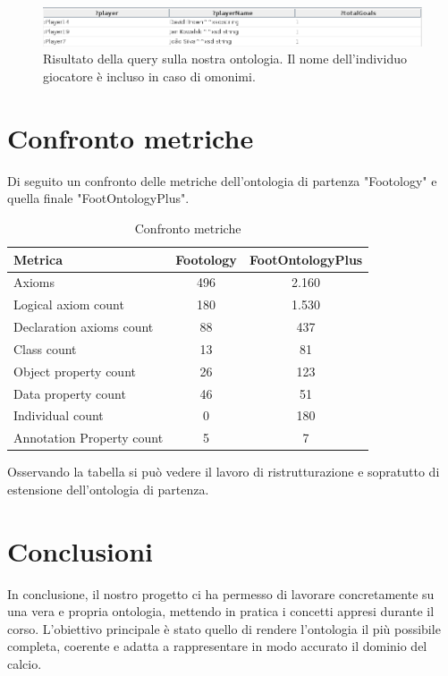 \documentclass[11pt]{report} %
\begin{document}
\begin{figure}[H]
	\includegraphics[width=\textwidth]{query5}
	\caption{Risultato della query sulla nostra ontologia. Il nome dell'individuo giocatore è incluso in caso di omonimi.}
\end{figure}

\chapter{Confronto metriche}

Di seguito un confronto delle metriche dell'ontologia di partenza "Footology" e quella finale "FootOntologyPlus".

\hfill

\begin{table}[h!]
\centering
\begin{tabular}{|l|c|c|}
\hline
\textbf{Metrica} & \textbf{Footology} & \textbf{FootOntologyPlus} \\
\hline
Axioms & 496 & 2.160 \\
Logical axiom count & 180 & 1.530 \\
Declaration axioms count & 88 & 437 \\
Class count & 13 & 81 \\
Object property count & 26 & 123 \\
Data property count & 46 & 51 \\
Individual count & 0 & 180 \\
Annotation Property count & 5 & 7 \\
\hline
\end{tabular}
\caption{Confronto metriche}
\end{table}

\hfill

Osservando la tabella si può vedere il lavoro di ristrutturazione e sopratutto di estensione dell'ontologia di partenza.


\chapter{Conclusioni}

In conclusione, il nostro progetto ci ha permesso di lavorare concretamente su una vera e propria ontologia, mettendo in pratica i concetti appresi durante il corso. L’obiettivo principale è stato quello di rendere l’ontologia il più possibile completa, coerente e adatta a rappresentare in modo accurato il dominio del calcio.
\end{document}
